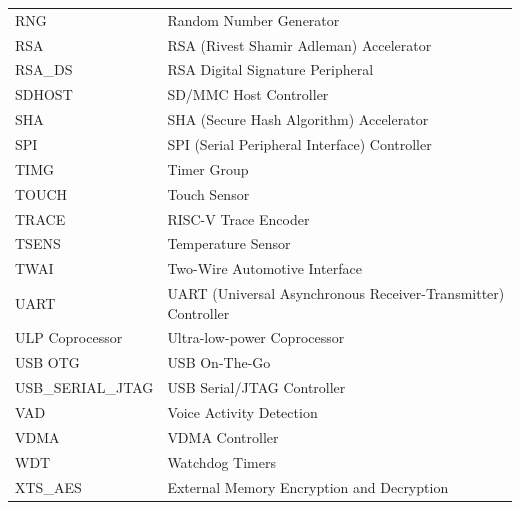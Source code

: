 \begin{longtable}[c]{ R{3cm} p{12cm} }
RNG & Random Number Generator \\
RSA & RSA (Rivest Shamir Adleman) Accelerator \\
RSA\_DS & RSA Digital Signature Peripheral \\
SDHOST & SD/MMC Host Controller \\
SHA & SHA (Secure Hash Algorithm) Accelerator \\
SPI & SPI (Serial Peripheral Interface) Controller \\
TIMG & Timer Group \\
TOUCH & Touch Sensor \\
TRACE & RISC-V Trace Encoder \\
TSENS & Temperature Sensor \\
TWAI & Two-Wire Automotive Interface \\
UART & UART (Universal Asynchronous Receiver-Transmitter) Controller \\
ULP Coprocessor & Ultra-low-power Coprocessor \\
USB OTG & USB On-The-Go \\
USB\_SERIAL\_JTAG & USB Serial/JTAG Controller \\
VAD & Voice Activity Detection \\
VDMA & VDMA Controller \\
WDT & Watchdog Timers \\
XTS\_AES & External Memory Encryption and Decryption \\

\end{longtable}





